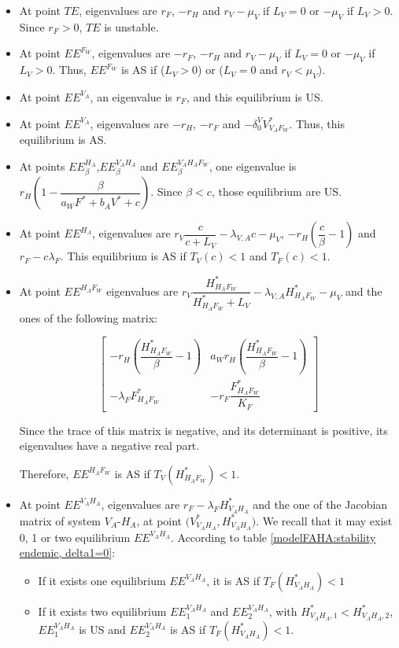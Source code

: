 \documentclass{article}
\newcommand{\lva}{\lambda_{V, A}}
\newcommand{\lfw}{\lambda_{F}}
\newcommand{\dv}{\delta_0^V}
\begin{document}
\begin{itemize}
\item At point $TE$, eigenvalues are $r_F$, $-r_H$ and $r_V - \mu_V$ if $L_V = 0$ or $-\mu_V$ if $L_V > 0$. Since $r_F > 0$, $TE$ is unstable.
\item At point $EE^{F_W}$, eigenvalues are $-r_F$, $-r_H$ and $r_V - \mu_V$ if $L_V = 0$ or $-\mu_V$ if $L_V > 0$.
Thus, $EE^{F_W}$ is AS if ($L_V > 0$) or ($L_V = 0$ and $r_V < \mu_V$).
\item At point $EE^{V_A}$, an eigenvalue is $r_F$, and this equilibrium is US.
\item At point $EE^{V_A}$, eigenvalues are $-r_H$, $-r_F$ and $-\dv V^*_{V_AF_W}$. Thus, this equilibrium is AS.
\item At points $EE^{H_A}_\beta$,$EE^{V_AH_A}_\beta$ and $EE^{V_AH_AF_W}_\beta$, one eigenvalue is $r_H \left(1 - \dfrac{\beta}{a_W F^* + b_A V^* + c} \right)$. Since $\beta < c$, those equilibrium are US.

\item At point $EE^{H_A}$, eigenvalues are $r_V \dfrac{c}{c + L_V} - \lva c - \mu_V$, $-r_H \left(\dfrac{c}{\beta}-1 \right)$ and $r_F - c \lfw$. This equilibrium is AS if $T_V(c) < 1$ and $T_F(c) < 1$.

\item At point $EE^{H_AF_W}$ eigenvalues are $r_V \dfrac{H^*_{H_AF_W}}{H^*_{H_AF_W} + L_V} - \lva H^*_{H_AF_W} - \mu_V$ and the ones of the following matrix:

$$
\begin{bmatrix}
-r_H \left(\dfrac{H^*_{H_AF_W}}{\beta} -1\right) & a_W r_H \left(\dfrac{H^*_{H_AF_W}}{\beta} -1\right) \\
- \lfw F^*_{H_AF_W} & - r_F \dfrac{F^*_{H_AF_W}}{K_F}
\end{bmatrix}
$$

Since the trace of this matrix is negative, and its determinant is positive, its eigenvalues have a negative real part.

Therefore, $EE^{H_AF_W}$ is AS if $T_V(H^*_{H_AF_W}) < 1$.

\item At point $EE^{V_AH_A}$, eigenvalues are $r_F - \lfw H^*_{V_AH_A}$ and the one of the Jacobian matrix of system $V_A$-$H_A$, at point $\Big(V^*_{V_AH_A}, H^*_{V_AH_A} \Big)$. 
We recall that it may exist 0, 1 or two equilibrium $EE^{V_AH_A}$. According to table \ref{modelFAHA:stability endemic, delta1=0}:
\begin{itemize}
\item If it exists one equilibrium $EE^{V_AH_A}$, it is AS if $T_F(H^*_{V_AH_A}) < 1$
\item If it exists two equilibrium $EE^{V_AH_A}_1$ and $EE^{V_AH_A}_2$, with $H^*_{V_AH_A, 1} < H^*_{V_AH_A,2}$, $EE^{V_AH_A}_1$ is US and $EE^{V_AH_A}_2$ is AS if $T_F(H^*_{V_AH_A}) < 1$.
\end{itemize}



\end{itemize}
\end{document}
